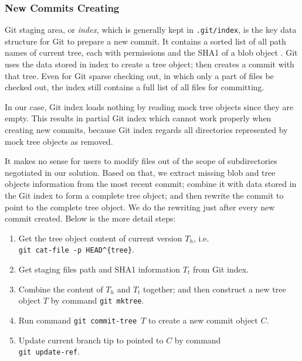 \documentclass[preprint]{sigplanconf}
\begin{document}
\subsubsection{New Commits Creating}\label{sec:create-new-commit}
Git staging area, or \emph{index}, which is generally kept in \verb|.git/index|,
is the key data structure for Git to prepare a new commit.
It contains a sorted list of all path names of current tree, each with
permissions and the SHA1 of a blob object \cite{idx-format}.
Git uses the data stored in index to create a tree object; then creates a
commit with that tree.
Even for Git sparse checking out, in which only a part of files be checked
out, the index still contains a full list of all files for committing.

In our case, Git index loads nothing by reading mock tree objects
since they are empty.
This results in partial Git index which cannot work properly when creating new
commits, because Git index regards all directories represented by mock tree
objects as removed.

It makes no sense for users to modify files out of the scope of
subdirectories negotiated in our solution.
Based on that, we extract missing blob and tree objects information from the
most recent commit; combine it with data stored in the Git index to form a
complete tree object; and then rewrite the commit to point to the complete tree
object.
We do the rewriting just after every new commit created.
Below is the more detail steps:

\begin{enumerate}
  \item Get the tree object content of current version $T_h$, i.e. \\
        \verb|git cat-file -p HEAD^{tree}|.

  \item Get staging files path and SHA1 information $T_t$ from Git index.

  \item Combine the content of $T_h$ and $T_t$ together; and then construct a
        new tree object $T$ by command \verb|git mktree|.

  \item Run command \verb|git commit-tree |$T$ to create a new commit object
        $C$.

  \item Update current branch tip to pointed to $C$ by command \\
        \verb|git update-ref|.
\end{enumerate}
\end{document}
